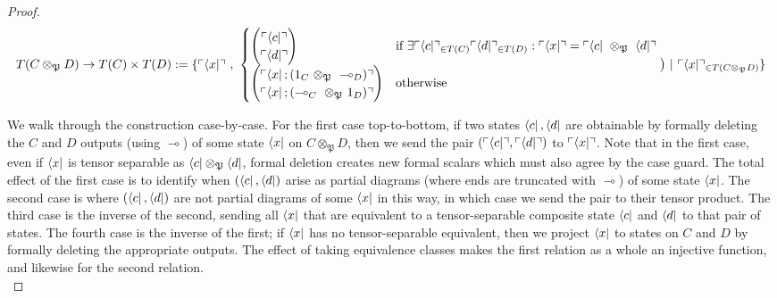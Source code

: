 \begin{theorem}
\begin{proof}
\[T(C \otimes_\mathfrak{P} D) \rightarrow T(C) \times T(D) := \{ \ulcorner \bra{x} \urcorner \ , \ \begin{cases} \begin{pmatrix} \ulcorner \bra{c} \urcorner \\ \ulcorner \bra{d} \urcorner \end{pmatrix} & \text{if }\exists \ulcorner \bra{c} \urcorner_{\in T(C)} \ulcorner \bra{d} \urcorner_{\in T(D)}: \ulcorner \bra{x} \urcorner = \ulcorner \bra{c} \ \otimes_\mathfrak{P} \ \bra{d} \urcorner \\ \begin{pmatrix} \ulcorner \bra{x};(1_C \ \otimes_\mathfrak{P} \ \multimap_D) \urcorner \\ \ulcorner \bra{x};(\multimap_C \ \otimes_\mathfrak{P} \ 1_D) \urcorner \end{pmatrix} & \text{otherwise} \end{cases} \big) \ | \ \ulcorner \bra{x} \urcorner_{\in T(C \otimes_\mathfrak{P} D)} \}\]

We walk through the construction case-by-case. For the first case top-to-bottom, if two states $\bra{c},\bra{d}$ are obtainable by formally deleting the $C$ and $D$ outputs (using $\multimap$) of some state $\bra{x}$ on $C \otimes_\mathfrak{P} D$, then we send the pair $(\ulcorner \bra{c} \urcorner,\ulcorner \bra{d} \urcorner)$ to $\ulcorner \bra{x} \urcorner$. Note that in the first case, even if $\bra{x}$ is tensor separable as $\bra{c} \otimes_\mathfrak{P} \bra{d}$, formal deletion creates new formal scalars which must also agree by the case guard. The total effect of the first case is to identify when $(\bra{c},\bra{d})$ arise as partial diagrams (where ends are truncated with $\multimap$) of some state $\bra{x}$. The second case is where $(\bra{c},\bra{d})$ are not partial diagrams of some $\bra{x}$ in this way, in which case we send the pair to their tensor product. The third case is the inverse of the second, sending all $\bra{x}$ that are equivalent to a tensor-separable composite state $\bra{c}$ and $\bra{d}$ to that pair of states. The fourth case is the inverse of the first; if $\bra{x}$ has no tensor-separable equivalent, then we project $\bra{x}$ to states on $C$ and $D$ by formally deleting the appropriate outputs. The effect of taking equivalence classes makes the first relation as a whole an injective function, and likewise for the second relation.\\


\end{proof}
\end{theorem}
